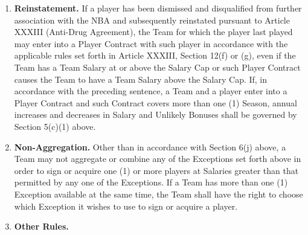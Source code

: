 \documentclass[
]{book}
\begin{document}
\begin{enumerate}
\begin{enumerate}
  \end{enumerate}
\item
  \textbf{Reinstatement.} If a player has been dismissed and disqualified from further association with the NBA and subsequently reinstated pursuant to Article XXXIII (Anti-Drug Agreement), the Team for which the player last played may enter into a Player Contract with such player in accordance with the applicable rules set forth in Article XXXIII, Section 12(f) or (g), even if the Team has a Team Salary at or above the Salary Cap or such Player Contract causes the Team to have a Team Salary above the Salary Cap. If, in accordance with the preceding sentence, a Team and a player enter into a Player Contract and such Contract covers more than one (1) Season, annual increases and decreases in Salary and Unlikely Bonuses shall be governed by Section 5(c)(1) above.
\item
  \textbf{Non-Aggregation.} Other than in accordance with Section 6(j) above, a Team may not aggregate or combine any of the Exceptions set forth above in order to sign or acquire one (1) or more players at Salaries greater than that permitted by any one of the Exceptions. If a Team has more than one (1) Exception available at the same time, the Team shall have the right to choose which Exception it wishes to use to sign or acquire a player.
\item
  \textbf{Other Rules.}


\end{enumerate}
\end{document}

